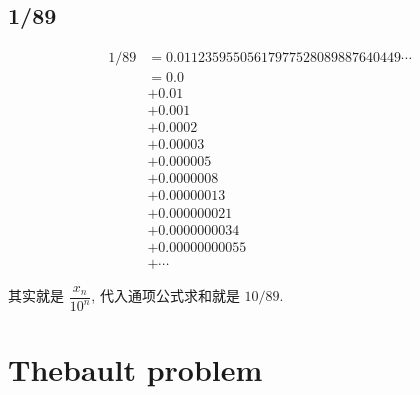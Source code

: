 \subsection {1/89}
\begin{align*}
1/89 &= 0.01123595505617977528089887640449\cdots \\
	&= 0.0 \\
	 & + 0.01 \\
	&+ 0.001\\
	&+ 0.0002 \\
	&+ 0.00003\\
	&+ 0.000005\\
	&+ 0.0000008\\
	&+ 0.00000013\\
	&+ 0.000000021\\
	&+ 0.0000000034\\
	&+ 0.00000000055\\
	&+\cdots
\end{align*}

其实就是 $\dfrac{x_n}{10^n}$, 代入通项公式求和就是 $ 10 / 89 $.

\newpage
\section{Thebault problem}

